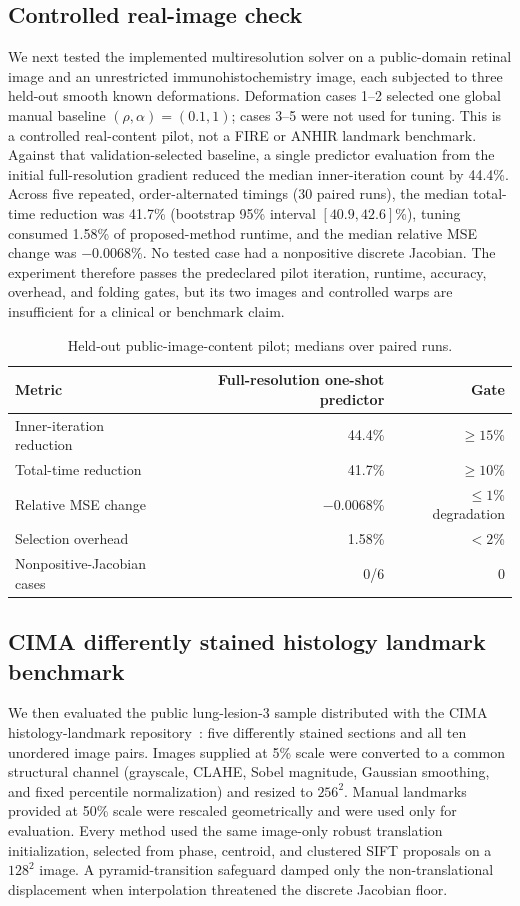 \documentclass[pdflatex,iicol,sn-mathphys-num]{sn-jnl}
\theoremstyle{definition}\newtheorem{definition}[theorem]{Definition}\newtheorem{remark}[theorem]{Remark}
\begin{document}
\subsection{Controlled real-image check}
We next tested the implemented multiresolution solver on a public-domain retinal
image and an unrestricted immunohistochemistry image, each subjected to three
held-out smooth known deformations.  Deformation cases 1--2 selected one global
manual baseline $(\rho,\alpha)=(0.1,1)$; cases 3--5 were not used for tuning.
This is a controlled real-content pilot, not a FIRE or ANHIR landmark benchmark.
Against that validation-selected baseline, a single predictor evaluation from
the initial full-resolution gradient reduced the median inner-iteration count
by 44.4\%.  Across five repeated, order-alternated timings (30 paired runs), the
median total-time reduction was 41.7\% (bootstrap 95\% interval
$[40.9,42.6]$\%), tuning consumed 1.58\% of proposed-method runtime, and the
median relative MSE change was $-0.0068$\%.  No tested case had a nonpositive
discrete Jacobian.  The experiment therefore passes the predeclared pilot
iteration, runtime, accuracy, overhead, and folding gates, but its two images
and controlled warps are insufficient for a clinical or benchmark claim.

\begin{table}[ht]
\centering
\caption{Held-out public-image-content pilot; medians over paired runs.}
\begin{tabular}{lrr}
\toprule
Metric & Full-resolution one-shot predictor & Gate\\
\midrule
Inner-iteration reduction & 44.4\% & $\ge15$\%\\
Total-time reduction & 41.7\% & $\ge10$\%\\
Relative MSE change & $-0.0068$\% & $\le1$\% degradation\\
Selection overhead & 1.58\% & $<2$\%\\
Nonpositive-Jacobian cases & 0/6 & 0\\
\bottomrule
\end{tabular}
\end{table}

\subsection{CIMA differently stained histology landmark benchmark}
We then evaluated the public lung-lesion-3 sample distributed with the CIMA
histology-landmark repository~\cite{Borovec2018}: five differently stained sections and all ten
unordered image pairs.  Images supplied at 5\% scale were converted to a common
structural channel (grayscale, CLAHE, Sobel magnitude, Gaussian smoothing, and
fixed percentile normalization) and resized to $256^2$.  Manual landmarks
provided at 50\% scale were rescaled geometrically and were used only for
evaluation.  Every method used the same image-only robust translation
initialization, selected from phase, centroid, and clustered SIFT proposals on
a $128^2$ image.  A pyramid-transition safeguard damped only the
non-translational displacement when interpolation threatened the discrete
Jacobian floor.
\end{document}
